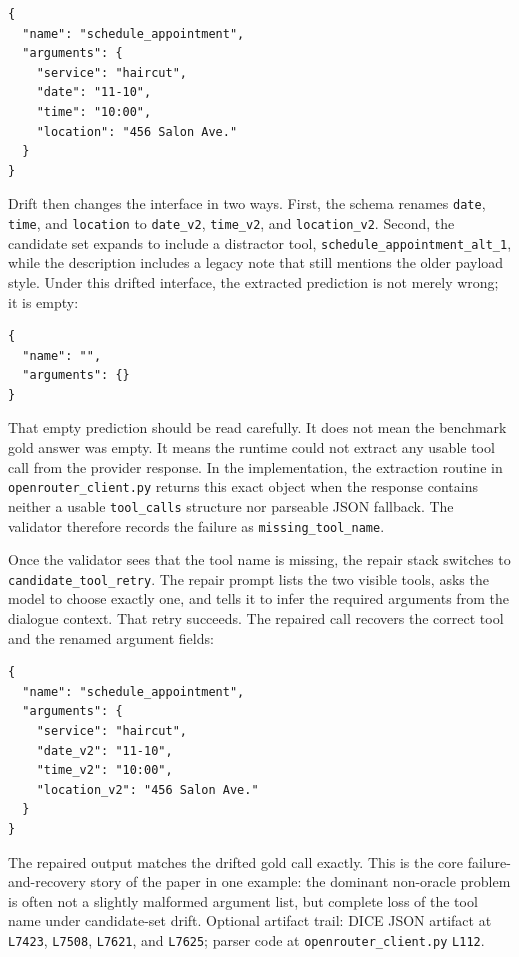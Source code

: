 \documentclass{svproc}
\newcommand{\artifactlink}[2]{#2}
\newcommand{\artifactref}[2]{\texttt{L#2}}
\newcommand{\dicerunfile}{outputs/dice/dice-bench-live-20260414-170240-443375/dice_results.json}
\newcommand{\dicerunlink}{\artifactlink{\dicerunfile}{DICE JSON artifact}}
\newcommand{\openrouterlink}{\artifactlink{inference/openrouter_client.py}{\nolinkurl{openrouter_client.py}}}
\begin{document}
\begin{verbatim}
{
  "name": "schedule_appointment",
  "arguments": {
    "service": "haircut",
    "date": "11-10",
    "time": "10:00",
    "location": "456 Salon Ave."
  }
}
\end{verbatim}

Drift then changes the interface in two ways. First, the schema renames
\texttt{date}, \texttt{time}, and \texttt{location} to
\texttt{date\_v2}, \texttt{time\_v2}, and \texttt{location\_v2}. Second, the
candidate set expands to include a distractor tool,
\texttt{schedule\_appointment\_alt\_1}, while the description includes a legacy
note that still mentions the older payload style. Under this drifted interface,
the extracted prediction is not merely wrong; it is empty:

\begin{verbatim}
{
  "name": "",
  "arguments": {}
}
\end{verbatim}

That empty prediction should be read carefully. It does not mean the benchmark
gold answer was empty. It means the runtime could not extract any usable tool
call from the provider response. In the implementation, the extraction routine in
\openrouterlink{} returns this exact object when the response contains neither a
usable \texttt{tool\_calls} structure nor parseable JSON fallback. The validator
therefore records the failure as \texttt{missing\_tool\_name}.

Once the validator sees that the tool name is missing, the repair stack switches
to \texttt{candidate\_tool\_retry}. The repair prompt lists the two visible
tools, asks the model to choose exactly one, and tells it to infer the required
arguments from the dialogue context. That retry succeeds. The repaired call
recovers the correct tool and the renamed argument fields:

\begin{verbatim}
{
  "name": "schedule_appointment",
  "arguments": {
    "service": "haircut",
    "date_v2": "11-10",
    "time_v2": "10:00",
    "location_v2": "456 Salon Ave."
  }
}
\end{verbatim}

The repaired output matches the drifted gold call exactly. This is the core
failure-and-recovery story of the paper in one example: the dominant non-oracle
problem is often not a slightly malformed argument list, but complete loss of the
tool name under candidate-set drift. Optional artifact trail: \dicerunlink{} at
\artifactref{\dicerunfile}{7423}, \artifactref{\dicerunfile}{7508},
\artifactref{\dicerunfile}{7621}, and \artifactref{\dicerunfile}{7625}; parser
code at \openrouterlink{} \artifactref{inference/openrouter_client.py}{112}.
\end{document}
